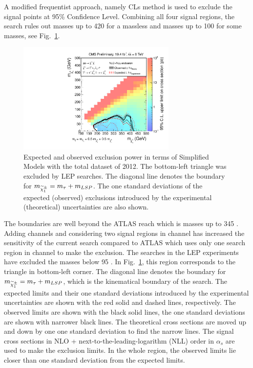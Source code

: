 A modified frequentist approach, namely CLs method \cite{read:CLs} is used to 
exclude the signal points at 95\% Confidence Level.
Combining all four signal regions,
the search rules out \chione  masses up to 420 \GeV  for a massless \PSGczDo and  \PSGczDo masses up to 100 \GeV for some  \chione masses,
see Fig.~\ref{fig:limit_final}. 
\begin{linenomath}
\begin{figure}[!Hhtb]
\centering
\includegraphics[width=0.7\textwidth,keepaspectratio=true]{StatisticsFig/Exclusion4Bins.pdf}
\caption{Expected and observed exclusion power in terms of Simplified Models
with the total dataset of 2012. The bottom-left triangle was excluded by LEP \sTau searches. 
The diagonal line denotes the boundary for $m_{\widetilde{\chi}^{\pm}_1} = m_{\tau} + m_{LSP}$.
The one standard deviations of the expected (observed) exclusions introduced by the experimental 
(theoretical) uncertainties are also shown.}
\label{fig:limit_final}
\end{figure}
\end{linenomath}
The boundaries are well beyond the ATLAS reach which is \chione  masses up to 345 \GeV \cite{Aad:2014yka}. Adding \leptonTau channels
and considering two signal regions in \tauTau channel has increased the sensitivity of the current search compared to ATLAS which uses only 
one search region in \tauTau channel to make the exclusion.
The \sTau searches in the LEP experiments \cite{lepsusy} have excluded the masses below 95 \GeV. In Fig.~\ref{fig:limit_final}, 
this region corresponds to the triangle in bottom-left corner.%
The diagonal line denotes the boundary for $m_{\widetilde{\chi}^{\pm}_1} = m_{\tau} + m_{LSP}$, which is the kinematical boundary of the search.
The expected limits and their one standard deviations introduced by the experimental 
uncertainties are shown with the red solid and dashed lines, respectively. The observed limits are shown with the black solid lines, the one 
standard deviations are shown with narrower black lines. The theoretical cross sections are moved up and down by one one standard deviation to 
find the narrow lines.
The signal cross sections in NLO + next-to-the-leading-logarithm (NLL) order in $\alpha_s$ are used to make the exclusion limits.
In the whole region, the observed limits lie closer than one standard deviation from the expected limits.  

